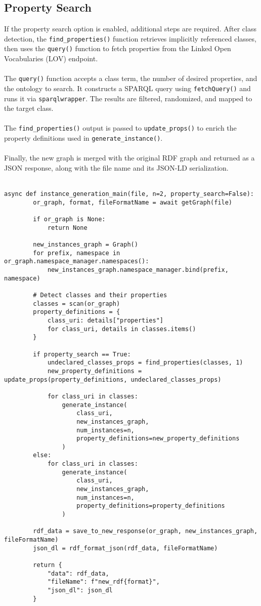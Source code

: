\subsection{Property Search}
If the property search option is enabled, additional steps are required. After class detection, the \texttt{find\_properties()} function retrieves implicitly referenced classes, then uses the \texttt{query()} function to fetch properties from the Linked Open Vocabularies (LOV) endpoint.
\\
\\
The \texttt{query()} function accepts a class term, the number of desired properties, and the ontology to search. It constructs a SPARQL query using \texttt{fetchQuery()} and runs it via \texttt{sparqlwrapper}. The results are filtered, randomized, and mapped to the target class.
\\
\\
The \texttt{find\_properties()} output is passed to \texttt{update\_props()} to enrich the property definitions used in \texttt{generate\_instance()}.
\\
\\
Finally, the new graph is merged with the original RDF graph and returned as a JSON response, along with the file name and its JSON-LD serialization.
\\
\\
\begin{lstlisting}[caption={Main Function for RDF Instance Generation}, label={lst:instance_generation_main}]
	async def instance_generation_main(file, n=2, property_search=False):
		or_graph, format, fileFormatName = await getGraph(file)
	
		if or_graph is None:
			return None
	
		new_instances_graph = Graph()
		for prefix, namespace in or_graph.namespace_manager.namespaces():
			new_instances_graph.namespace_manager.bind(prefix, namespace)
	
		# Detect classes and their properties
		classes = scan(or_graph)
		property_definitions = {
			class_uri: details["properties"]
			for class_uri, details in classes.items()
		}
	
		if property_search == True:
			undeclared_classes_props = find_properties(classes, 1)
			new_property_definitions = update_props(property_definitions, undeclared_classes_props)
	
			for class_uri in classes:
				generate_instance(
					class_uri,
					new_instances_graph,
					num_instances=n,
					property_definitions=new_property_definitions
				)
		else:
			for class_uri in classes:
				generate_instance(
					class_uri,
					new_instances_graph,
					num_instances=n,
					property_definitions=property_definitions
				)
	
		rdf_data = save_to_new_response(or_graph, new_instances_graph, fileFormatName)
		json_dl = rdf_format_json(rdf_data, fileFormatName)
	
		return {
			"data": rdf_data,
			"fileName": f"new_rdf{format}",
			"json_dl": json_dl
		}
	\end{lstlisting}

